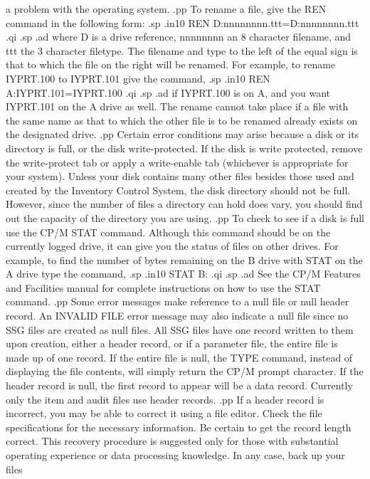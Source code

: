 a problem with the operating system.
.pp
To rename a file, give the REN command in the following form:
.sp
.in10
REN D:nnnnnnnn.ttt=D:nnnnnnnn.ttt
.qi
.sp
.ad
where D is a drive reference, nnnnnnnn an 8 character filename, and ttt the
3 character filetype.  The filename and type to the left of the equal sign
is that to which the file on the right will be renamed.  For example, to rename
IYPRT.100 to IYPRT.101 give the command,
.sp
.in10
REN A:IYPRT.101=IYPRT.100
.qi
.sp
.ad
if IYPRT.100 is on A, and you want IYPRT.101 on the A drive as well.  The
rename cannot take place if a file with the same name as that to which the
other file is to be renamed already exists on the designated drive.
.pp
Certain error conditions may arise because a disk or its directory is full,
or the disk write-protected.  If the disk is write protected, remove the
write-protect tab or apply a write-enable tab (whichever is appropriate for
your system).  Unless your disk contains many other files besides those used
and created by the Inventory Control System, the disk directory should not
be full.  However, since the number of files a directory can hold does
vary, you should find out the capacity of the directory you are using.
.pp
To check to see if a disk is full use the CP/M STAT command.  Although this
command should be on the currently logged drive, it can give you the status
of files on other drives.   For example, to find the number of bytes
remaining on the B drive with STAT on the A drive type the command,
.sp
.in10
STAT B:
.qi
.sp
.ad
See the CP/M Features and Facilities manual for complete instructions on
how to use the STAT command.
.pp
Some error messages make reference to a null file or null header record.
An INVALID FILE error message may also indicate a null file since no SSG
files are created as null files.  All SSG files have one record written
to them upon creation, either a header record, or if a parameter file,
the entire file is made up of one record.
If the entire file is null, the TYPE command, instead of displaying the
file contents, will simply return the CP/M prompt character.  If the header
record is null, the first record to appear will be a data record.  Currently
only the item and audit files use header records.
.pp
If a header record is incorrect, you may be able to correct it using a file
editor.  Check the file specifications for the necessary information.
Be certain to get the record length correct. This
recovery procedure is suggested only for those with substantial operating
experience or data processing knowledge.  In any case, back up your files
